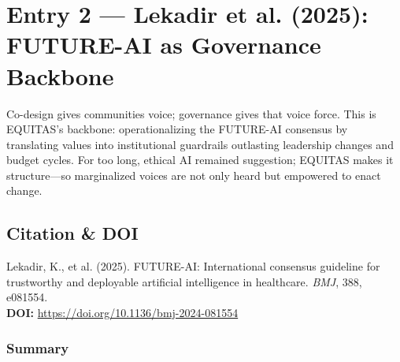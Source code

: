 \documentclass[11pt,twoside]{article}
\begin{document}
\newpage


\setcounter{page}{10}

\section*{\label{entry2}Entry 2 --- Lekadir et al. (2025): FUTURE-AI as Governance Backbone}

\vspace{-0.3cm}

Co-design gives communities voice; governance gives that voice force. This is \textsc{EQUITAS}'s backbone: operationalizing the FUTURE-AI consensus by translating values into institutional guardrails outlasting leadership changes and budget cycles. For too long, ethical AI remained suggestion; EQUITAS makes it structure---so marginalized voices are not only heard but empowered to enact change.

\vspace{-0.3cm}

\subsection*{Citation \& DOI}

\vspace{-0.3cm}

Lekadir, K., et al. (2025). FUTURE-AI: International consensus guideline for trustworthy and deployable artificial intelligence in healthcare. \textit{BMJ}, 388, e081554. \\

\textbf{DOI:} \href{https://doi.org/10.1136/bmj-2024-081554}{https://doi.org/10.1136/bmj-2024-081554}

\vspace{-0.3cm}

\subsubsection*{Summary}

\vspace{-0.3cm}
\end{document}
